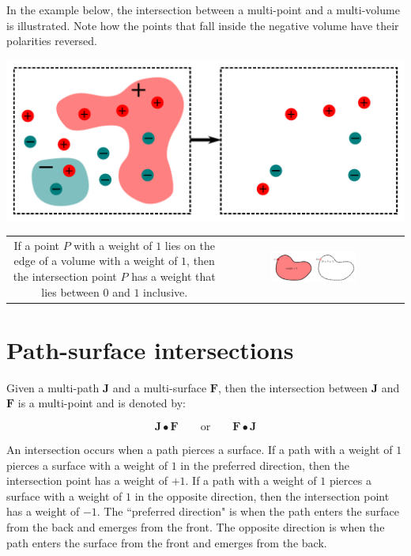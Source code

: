 In the example below, the intersection between a multi-point and a multi-volume is illustrated. Note how the points that fall inside the negative volume have their polarities reversed. 

\begin{center}
\includegraphics[scale = 0.4]{Intersections/Point-volume_intersections/point_volume_intersections_two_panel_example}
\end{center}

\begin{tabular}{cc}
\parbox{0.5\textwidth}{
If a point \(P\) with a weight of \(1\) lies on the edge of a volume with a weight of \(1\), then the intersection point \(P\) has a weight that lies between \(0\) and \(1\) inclusive.
} & \parbox{0.5\textwidth}{
\includegraphics[width = 0.5\textwidth]{Intersections/Point-volume_intersections/point_volume_intersection_boundary_case}
}
\end{tabular}





\section{Path-surface intersections}

Given a multi-path \(\mathbf{J}\) and a multi-surface \(\mathbf{F}\), then the intersection between \(\mathbf{J}\) and \(\mathbf{F}\) is a multi-point and is denoted by:

\[\mathbf{J} \bullet \mathbf{F} \quad\quad\text{or}\quad\quad \mathbf{F} \bullet \mathbf{J}\]

An intersection occurs when a path pierces a surface. If a path with a weight of \(1\) pierces a surface with a weight of \(1\) in the preferred direction, then the intersection point has a weight of \(+1\). If a path with a weight of \(1\) pierces a surface with a weight of \(1\) in the opposite direction, then the intersection point has a weight of \(-1\). The ``preferred direction" is when the path enters the surface from the back and emerges from the front. The opposite direction is when the path enters the surface from the front and emerges from the back.

